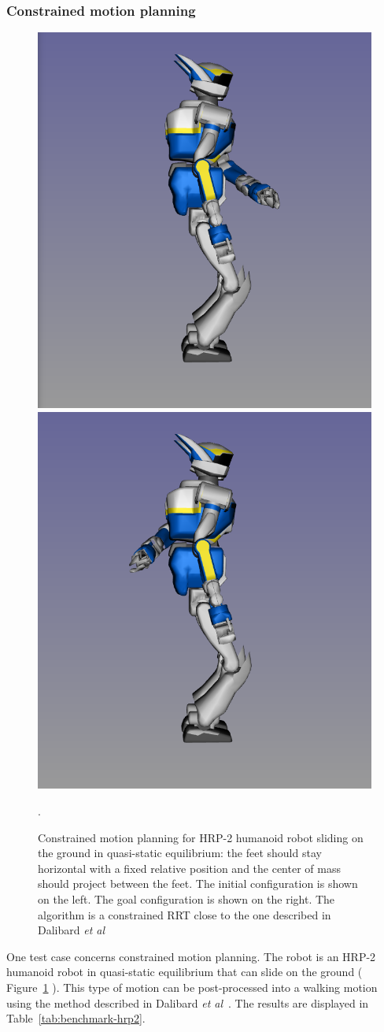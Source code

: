 \subsubsection{Constrained motion planning}

\begin{figure}
  \begin{center}
    \includegraphics[width=.49\linewidth]{figures/hrp2-q-init.png}
    \includegraphics[width=.49\linewidth]{figures/hrp2-q-goal.png}
  \end{center}
  \caption{Constrained motion planning for HRP-2 humanoid robot sliding on the ground in quasi-static equilibrium: the feet should stay horizontal with a fixed relative position and the center of mass should project between the feet. The initial configuration is shown on the left. The goal configuration is shown on the right. The algorithm is a constrained RRT close to the one described in {\color{blue}Dalibard \textit{et al}}~\cite{DalNakLamLau2009}}.
  \label{fig:benchmark-hrp2}
\end{figure}
One test case concerns constrained motion planning. The robot is an HRP-2 humanoid robot in quasi-static equilibrium that can slide on the ground ( {\color{blue}Figure~\ref{fig:benchmark-hrp2}} ). This type of motion can be post-processed into a walking motion using the method described in {\color{blue}Dalibard \textit{et al}}~\cite{dalibard:hal-00654175}. The results are displayed in Table~\ref{tab:benchmark-hrp2}.
